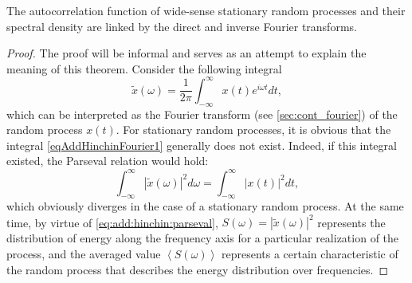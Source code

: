 \begin{theorem}
\label{thm:khinchin_wiener}
The autocorrelation function of wide-sense stationary random processes
and their spectral density are linked by the direct and inverse
Fourier transforms.

\begin{proof}
The proof will be informal and serves as an attempt to explain the meaning
of this theorem. Consider the following integral
\begin{equation}
\tilde{x}\left(\omega\right) = \frac{1}{2 \pi}
\int_{-\infty}^{\infty}x\left(t\right)e^{i \omega t}dt,
\label{eqAddHinchinFourier1}
\end{equation}
which can be interpreted as the Fourier transform (see \autoref{sec:cont_fourier})
of the random process
$x\left(t\right)$. For stationary random processes, it is obvious that
the integral \eqref{eqAddHinchinFourier1} generally does not exist.
Indeed, if this integral existed, the Parseval relation would hold:
\begin{equation}
\int_{-\infty}^\infty \left|\tilde{x}\left(\omega\right)\right|^2 d
\omega = \int_{-\infty}^\infty \left|x\left(t\right)\right|^2 dt,
\label{eq:add:hinchin:parseval}
\end{equation}
which obviously diverges in the case of a stationary random
process. At the same time, by virtue of \eqref{eq:add:hinchin:parseval}, 
$S\left(\omega\right) = \left|\tilde{x}\left(\omega\right)\right|^2$ represents
the distribution of energy along the frequency axis for a particular realization
of the process, and the averaged value
$\left<S\left(\omega\right)\right>$ represents a certain
characteristic of the random process that describes the energy distribution
over frequencies.


\end{proof}
\end{theorem}
